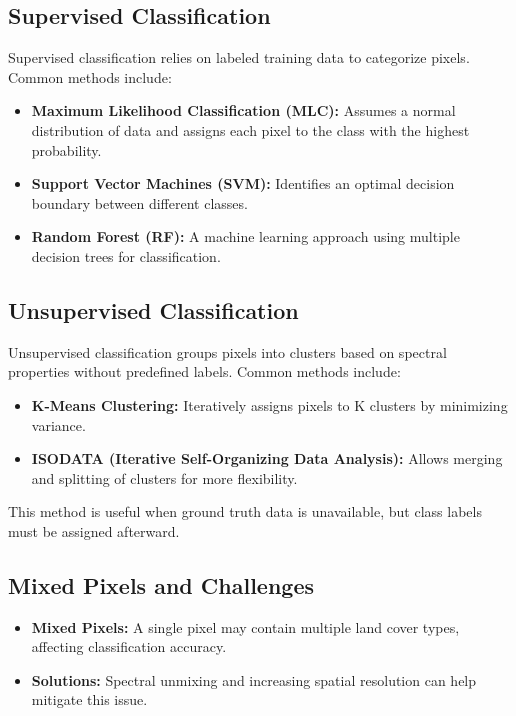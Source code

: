 \documentclass[
  letterpaper,
]{scrbook}
\begin{document}
\subsection{\texorpdfstring{\textbf{Supervised
Classification}}{Supervised Classification}}\label{supervised-classification}

Supervised classification relies on labeled training data to categorize
pixels. Common methods include:

\begin{itemize}
\item
  \textbf{Maximum Likelihood Classification (MLC):} Assumes a normal
  distribution of data and assigns each pixel to the class with the
  highest probability.
\item
  \textbf{Support Vector Machines (SVM):} Identifies an optimal decision
  boundary between different classes.
\item
  \textbf{Random Forest (RF):} A machine learning approach using
  multiple decision trees for classification.
\end{itemize}

\subsection{\texorpdfstring{\textbf{Unsupervised
Classification}}{Unsupervised Classification}}\label{unsupervised-classification}

Unsupervised classification groups pixels into clusters based on
spectral properties without predefined labels. Common methods include:

\begin{itemize}
\item
  \textbf{K-Means Clustering:} Iteratively assigns pixels to K clusters
  by minimizing variance.
\item
  \textbf{ISODATA (Iterative Self-Organizing Data Analysis):} Allows
  merging and splitting of clusters for more flexibility.
\end{itemize}

This method is useful when ground truth data is unavailable, but class
labels must be assigned afterward.

\subsection{\texorpdfstring{\textbf{Mixed Pixels and
Challenges}}{Mixed Pixels and Challenges}}\label{mixed-pixels-and-challenges}

\begin{itemize}
\item
  \textbf{Mixed Pixels:} A single pixel may contain multiple land cover
  types, affecting classification accuracy.
\item
  \textbf{Solutions:} Spectral unmixing and increasing spatial
  resolution can help mitigate this issue.
\end{itemize}
\end{document}
